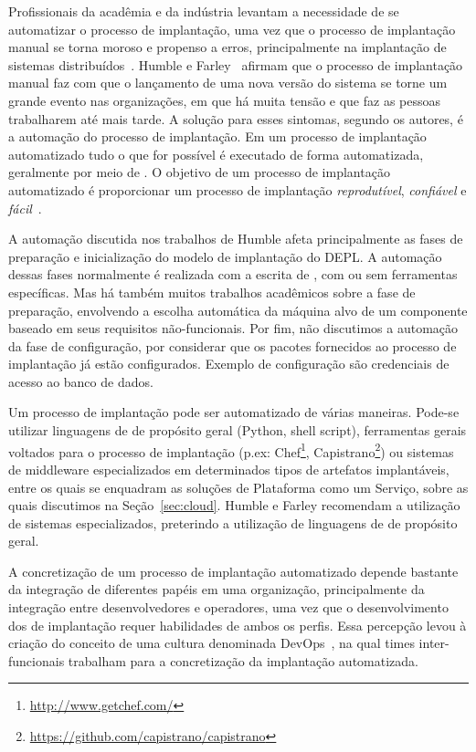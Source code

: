 Profissionais da acadêmia e da indústria levantam a necessidade de se automatizar o processo de implantação, uma vez que o processo de implantação manual se torna moroso e propenso a erros, principalmente na implantação de sistemas distribuídos~\cite{Humble2011Continuous,Dolstra2005Configuration}. 
Humble e Farley~\cite{Humble2011Continuous} afirmam que o processo de implantação manual faz com que  
o lançamento de uma nova versão do sistema se torne um grande evento nas organizações, 
em que há muita tensão e que faz as pessoas trabalharem até mais tarde.
A solução para esses sintomas, segundo os autores, é a automação do processo de implantação.
Em um processo de implantação automatizado tudo o que for possível é executado de forma automatizada,
geralmente por meio de \scripts. O objetivo de um processo de implantação automatizado
é proporcionar um processo de implantação \emph{reprodutível}, \emph{confiável} e \emph{fácil}~\cite{Humble2011Continuous}.

A automação discutida nos trabalhos de Humble afeta principalmente as fases de preparação e inicialização do modelo de implantação do DEPL. A automação dessas fases normalmente é realizada com a escrita de \scripts, com ou sem ferramentas específicas. Mas há também muitos trabalhos acadêmicos sobre a fase de preparação, envolvendo a escolha automática da máquina alvo de um componente baseado em seus requisitos não-funcionais. Por fim, não discutimos a automação da fase de configuração, por considerar que os pacotes fornecidos ao processo de implantação já estão configurados. Exemplo de configuração são credenciais de acesso ao banco de dados.

Um processo de implantação pode ser automatizado de várias maneiras.
Pode-se utilizar linguagens de \script de propósito geral (Python, shell script),
ferramentas gerais voltados para o processo de implantação (p.ex: 
Chef\footnote{\url{http://www.getchef.com/}}, Capistrano\footnote{\url{https://github.com/capistrano/capistrano}})
ou sistemas de middleware especializados em determinados tipos de artefatos implantáveis,
entre os quais se enquadram as soluções de Plataforma como um Serviço,
sobre as quais discutimos na Seção~\ref{sec:cloud}.
Humble e Farley recomendam a utilização de sistemas especializados, preterindo 
a utilização de linguagens de \scripts de propósito geral.

A concretização de um processo de implantação automatizado depende bastante da
integração de diferentes papéis em uma organização, principalmente da integração entre desenvolvedores
e operadores, uma vez que o desenvolvimento dos \scripts de implantação requer
habilidades de ambos os perfis.
Essa percepção levou à criação do conceito de uma cultura 
denominada DevOps~\cite{Humble2011DevOps}, na qual times inter-funcionais
trabalham para a concretização da implantação automatizada.

